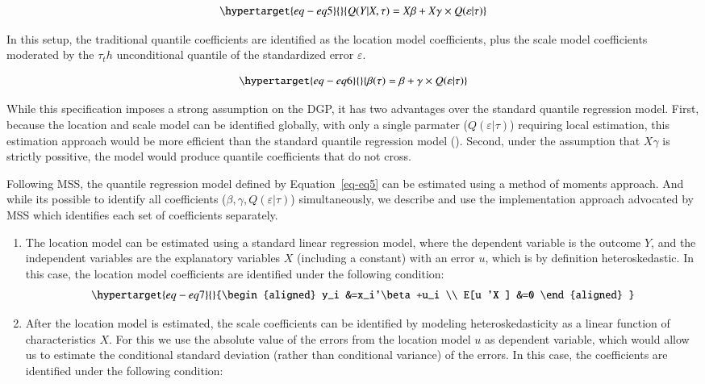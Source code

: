 \documentclass[
  authoryear,
  preprint,
  1p]{elsarticle}
\begin{document}
\begin{equation}\protect\hypertarget{eq-eq5}{}{Q(Y|X,\tau) =X\beta+X\gamma \times Q(\varepsilon|\tau)
}\label{eq-eq5}\end{equation}

In this setup, the traditional quantile coefficients are identified as
the location model coefficients, plus the scale model coefficients
moderated by the \(\tau_th\) unconditional quantile of the standardized
error \(\varepsilon\).

\begin{equation}\protect\hypertarget{eq-eq6}{}{\beta(\tau) = \beta + \gamma \times Q(\varepsilon|\tau)
}\label{eq-eq6}\end{equation}

While this specification imposes a strong assumption on the DGP, it has
two advantages over the standard quantile regression model. First,
because the location and scale model can be identified globally, with
only a single parmater (\(Q(\varepsilon|\tau)\)) requiring local
estimation, this estimation approach would be more efficient than the
standard quantile regression model (\citet{zhao2000}). Second, under the
assumption that \(X\gamma\) is strictly possitive, the model would
produce quantile coefficients that do not cross.

Following MSS, the quantile regression model defined by
Equation~\ref{eq-eq5} can be estimated using a method of moments
approach. And while its possible to identify all coefficients
(\(\beta,\gamma, Q(\varepsilon|\tau)\)) simultaneously, we describe and
use the implementation approach advocated by MSS which identifies each
set of coefficients separately.

\begin{enumerate}
\def\labelenumi{\arabic{enumi}.}
\item
  The location model can be estimated using a standard linear regression
  model, where the dependent variable is the outcome \(Y\), and the
  independent variables are the explanatory variables \(X\) (including a
  constant) with an error \(u\), which is by definition heteroskedastic.
  In this case, the location model coefficients are identified under the
  following condition:
  \begin{equation}\protect\hypertarget{eq-eq7}{}{\begin{aligned}
    y_i &=x_i'\beta+u_i \\
    E[u 'X ] &=0
    \end{aligned}
  }\label{eq-eq7}\end{equation}
\item
  After the location model is estimated, the scale coefficients can be
  identified by modeling heteroskedasticity as a linear function of
  characteristics \(X\). For this we use the absolute value of the
  errors from the location model \(u\) as dependent variable, which
  would allow us to estimate the conditional standard deviation (rather
  than conditional variance) of the errors. In this case, the
  coefficients are identified under the following condition:
\end{enumerate}
\end{document}
